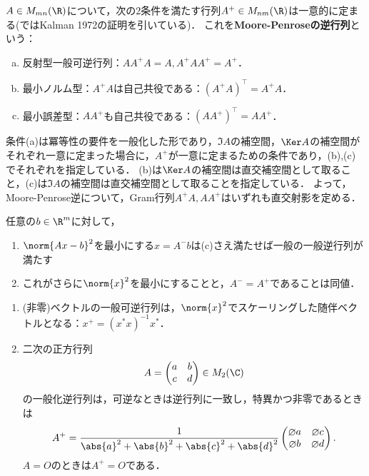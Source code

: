 \documentclass[uplatex, dvipdfmx]{jsreport}
\begin{document}
\begin{definition}
    $A\in M_{mn}(\R)$について，次の2条件を満たす行列$A^+\in M_{nm}(\R)$は一意的に定まる(\cite{柳井-竹内-一般逆行列}ではKalman 1972の証明を引いている)．
    これを\textbf{Moore-Penroseの逆行列}という：
    \begin{enumerate}[(a)]
        \item 反射型一般可逆行列：$AA^+A=A,A^+AA^+=A^+$．
        \item 最小ノルム型：$A^+A$は自己共役である：$(A^+A)^\top=A^+A$．
        \item 最小誤差型：$AA^+$も自己共役である：$(AA^+)^\top=AA^+$．
    \end{enumerate}
\end{definition}
\begin{remarks}
    条件(a)は冪等性の要件を一般化した形であり，$\Im A$の補空間，$\Ker A$の補空間がそれぞれ一意に定まった場合に，$A^+$が一意に定まるための条件であり，(b),(c)でそれぞれを指定している．
    (b)は$\Ker A$の補空間は直交補空間として取ること，(c)は$\Im A$の補空間は直交補空間として取ることを指定している．
    よって，Moore-Penrose逆について，Gram行列$A^+A,AA^+$はいずれも直交射影を定める．
\end{remarks}

\begin{proposition}
    任意の$b\in\R^m$に対して，
    \begin{enumerate}
        \item $\norm{Ax-b}^{2}$を最小にする$x=A^-b$は(c)さえ満たせば一般の一般逆行列が満たす
        \item これがさらに$\norm{x}^2$を最小にすることと，$A^-=A^+$であることは同値．
    \end{enumerate}
\end{proposition}

\begin{example}\mbox{}
    \begin{enumerate}
        \item (非零)ベクトルの一般可逆行列は，$\norm{x}^2$でスケーリングした随伴ベクトルとなる：$x^+=(x^*x)^{-1}x^*$．
        \item 二次の正方行列\[A=\begin{pmatrix}
            a&b\\c&d
        \end{pmatrix}\in M_2(\C)\]
        の一般化逆行列は，可逆なときは逆行列に一致し，特異かつ非零であるときは
        \[A^+=\frac{1}{\abs{a}^2+\abs{b}^2+\abs{c}^2+\abs{d}^2}\begin{pmatrix}\o{a}&\o{c}\\\o{b}&\o{d}\end{pmatrix}.\]
        $A=O$のときは$A^+=O$である．
    \end{enumerate}
\end{example}
\end{document}
